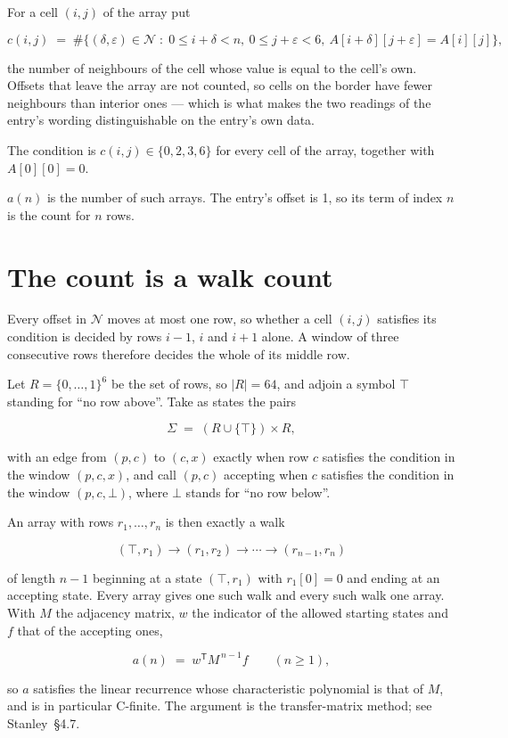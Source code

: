 \documentclass[11pt]{article}
\theoremstyle{definition}
\begin{document}
For a cell $(i,j)$ of the array put

\[c(i,j) \;=\; \#\bigl\{(\delta,\varepsilon)\in\mathcal{N} \;:\; 0\le i+\delta<n,\ 0\le j+\varepsilon<6,\ A[i+\delta][j+\varepsilon] = A[i][j]\bigr\},\]

the number of neighbours of the cell whose value is equal to the cell's own. Offsets that leave the array are not counted, so cells on the border have fewer neighbours than interior ones --- which is what makes the two readings of the entry's wording distinguishable on the entry's own data.

The condition is $c(i,j) \in \{0, 2, 3, 6\}$ for every cell of the array, together with $A[0][0]=0$.

$a(n)$ is the number of such arrays. The entry's offset is 1, so its term of index $n$ is the count for $n$ rows.

\section{The count is a walk count}

Every offset in $\mathcal{N}$ moves at most one row, so whether a cell $(i,j)$ satisfies its condition is decided by rows $i-1$, $i$ and $i+1$ alone. A window of three consecutive rows therefore decides the whole of its middle row.

Let $R = \{0,\dots,1\}^{6}$ be the set of rows, so $|R| = 64$, and adjoin a symbol $\top$ standing for ``no row above''. Take as states the pairs

\[\Sigma \;=\; (R \cup \{\top\}) \times R,\]

with an edge from $(p,c)$ to $(c,x)$ exactly when row $c$ satisfies the condition in the window $(p,c,x)$, and call $(p,c)$ accepting when $c$ satisfies the condition in the window $(p,c,\bot)$, where $\bot$ stands for ``no row below''.

An array with rows $r_1,\dots,r_n$ is then exactly a walk

\[(\top,r_1) \to (r_1,r_2) \to \cdots \to (r_{n-1},r_n)\]

of length $n-1$ beginning at a state $(\top,r_1)$ with $r_1[0]=0$ and ending at an accepting state. Every array gives one such walk and every such walk one array. With $M$ the adjacency matrix, $w$ the indicator of the allowed starting states and $f$ that of the accepting ones,

\[a(n) \;=\; w^{\mathsf T} M^{\,n-1} f \qquad (n \ge 1),\]

so $a$ satisfies the linear recurrence whose characteristic polynomial is that of $M$, and is in particular C-finite. The argument is the transfer-matrix method; see Stanley~\S4.7.
\end{document}
